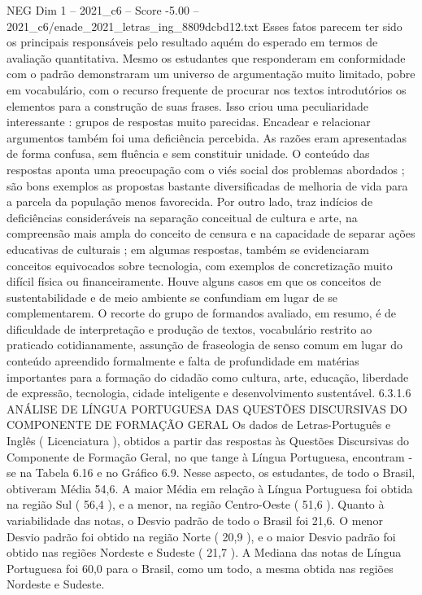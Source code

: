 \begin{textsample}{NEG Dim 1 – 2021\_c6 – Score -5.00 – 2021\_c6/enade\_2021\_letras\_ing\_8809dcbd12.txt}
Esses fatos parecem ter sido os principais responsáveis pelo resultado aquém do esperado em termos de avaliação quantitativa.
Mesmo os estudantes que responderam em conformidade com o padrão demonstraram um universo de argumentação muito limitado, pobre em vocabulário, com o recurso frequente de procurar nos textos introdutórios os elementos para a construção de suas frases.
Isso criou uma peculiaridade interessante : grupos de respostas muito parecidas.
Encadear e relacionar argumentos também foi uma deficiência percebida.
As razões eram apresentadas de forma confusa, sem fluência e sem constituir unidade.
O conteúdo das respostas aponta uma preocupação com o viés social dos problemas abordados ; são bons exemplos as propostas bastante diversificadas de melhoria de vida para a parcela da população menos favorecida.
Por outro lado, traz indícios de deficiências consideráveis na separação conceitual de cultura e arte, na compreensão mais ampla do conceito de censura e na capacidade de separar ações educativas de culturais ; em algumas respostas, também se evidenciaram conceitos equivocados sobre tecnologia, com exemplos de concretização muito difícil física ou financeiramente.
Houve alguns casos em que os conceitos de sustentabilidade e de meio ambiente se confundiam em lugar de se complementarem.
O recorte do grupo de formandos avaliado, em resumo, é de dificuldade de interpretação e produção de textos, vocabulário restrito ao praticado cotidianamente, assunção de fraseologia de senso comum em lugar do conteúdo apreendido formalmente e falta de profundidade em matérias importantes para a formação do cidadão como cultura, arte, educação, liberdade de expressão, tecnologia, cidade inteligente e desenvolvimento sustentável. 6.3.1.6 ANÁLISE DE LÍNGUA PORTUGUESA DAS QUESTÕES DISCURSIVAS DO COMPONENTE DE FORMAÇÃO GERAL Os dados de Letras-Português e Inglês ( Licenciatura ), obtidos a partir das respostas às Questões Discursivas do Componente de Formação Geral, no que tange à Língua Portuguesa, encontram -se na Tabela 6.16 e no Gráfico 6.9.
Nesse aspecto, os estudantes, de todo o Brasil, obtiveram Média 54,6.
A maior Média em relação à Língua Portuguesa foi obtida na região Sul ( 56,4 ), e a menor, na região Centro-Oeste ( 51,6 ).
Quanto à variabilidade das notas, o Desvio padrão de todo o Brasil foi 21,6.
O menor Desvio padrão foi obtido na região Norte ( 20,9 ), e o maior Desvio padrão foi obtido nas regiões Nordeste e Sudeste ( 21,7 ).
A Mediana das notas de Língua Portuguesa foi 60,0 para o Brasil, como um todo, a mesma obtida nas regiões Nordeste e Sudeste.

\end{textsample}
